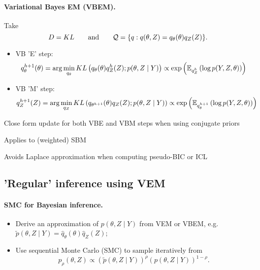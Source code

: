 \jump \paragraph{Variational Bayes EM (VBEM).} Take 
$$
D = KL 
\qquad \text{and} \qquad
\mathcal{Q} = \{q: q(\theta, Z) = q_\theta(\theta) q_Z(Z)\}.
$$
\begin{itemize}
\item VB 'E' step:
$$
q_\theta^{h+1}(\theta) 
= \arg\min_{q_\theta} KL\left(q_\theta(\theta) q_Z^h(Z); p(\theta, Z \mid Y)\right) 
\propto \exp\left(\mathbb E_{q^h_Z} \left( \log p(Y, Z, \theta) \right) \right)
$$
\item VB 'M' step:
$$
q_Z^{h+1}(Z) 
= \arg\min_{q_Z} KL\left(q_{\theta^{h+1}}(\theta) q_Z(Z); p(\theta, Z \mid Y)\right) 
\propto \exp\left(\mathbb E_{q^{h+1}_\theta} \left( \log p(Y, Z, \theta) \right) \right)
$$
\end{itemize}

\ra Close form update for both VBE and VBM steps when using conjugate priors \cite{BeG03}

\ra Applies to (weighted) SBM \citep{LBA12,LaR16,LRO18}

\ra Avoids Laplace approximation when computing pseudo-BIC or ICL \citep{LBA12,LaR16,KBC15}

\blank
\subsection{'Regular' inference using VEM}

\jump \paragraph{SMC for Bayesian inference.} \citep{DoR17}
\begin{itemize}
\item Derive an approximation of $p(\theta, Z \mid Y)$ from VEM or VBEM, e.g. $\widetilde{p}(\theta, Z \mid Y) = \widehat{q}_\theta(\theta) \widehat{q}_Z(Z)$;
\item Use sequential Monte Carlo (SMC) to sample iteratively from
$$
p_\rho(\theta, Z) \propto \left(\widetilde{p}(\theta, Z \mid Y)\right)^\rho \left(p(\theta, Z \mid Y)\right)^{1-\rho}.
$$
\end{itemize}

